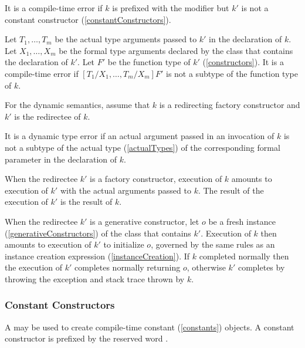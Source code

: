 \documentclass[makeidx]{article}
\begin{document}
\LMHash{}%
It is a compile-time error if $k$ is prefixed with the \CONST{} modifier but $k'$ is not a constant constructor (\ref{constantConstructors}).

\LMHash{}%
Let $T_1, \ldots, T_m$ be the actual type arguments passed to $k'$
in the declaration of $k$.
Let $X_1, \ldots, X_m$ be the formal type arguments declared by
the class that contains the declaration of $k'$.
Let $F'$ be the function type of $k'$ (\ref{constructors}).
It is a compile-time error if $[T_1/X_1, \ldots, T_m/X_m]F'$
is not a subtype of the function type of $k$.


\LMHash{}%
For the dynamic semantics,
assume that $k$ is a redirecting factory constructor
and $k'$ is the redirectee of $k$.

\LMHash{}%
It is a dynamic type error if an actual argument passed in an invocation of $k$
is not a subtype of the actual type (\ref{actualTypes})
of the corresponding formal parameter in the declaration of $k$.

\LMHash{}%
When the redirectee $k'$ is a factory constructor,
execution of $k$ amounts to execution of $k'$ with the actual arguments passed to $k$.
The result of the execution of $k'$ is the result of $k$.

\LMHash{}%
When the redirectee $k'$ is a generative constructor,
let $o$ be a fresh instance (\ref{generativeConstructors})
of the class that contains $k'$.
Execution of $k$ then amounts to execution of $k'$ to initialize $o$,
governed by the same rules as an instance creation expression (\ref{instanceCreation}).
If $k$ completed normally then the execution of $k'$ completes normally returning $o$,
otherwise $k'$ completes by throwing the exception and stack trace thrown by $k$.


\subsubsection{Constant Constructors}

\LMHash{}%
A 
may be used to create compile-time constant (\ref{constants}) objects.
A constant constructor is prefixed by the reserved word \CONST{}.
\end{document}
